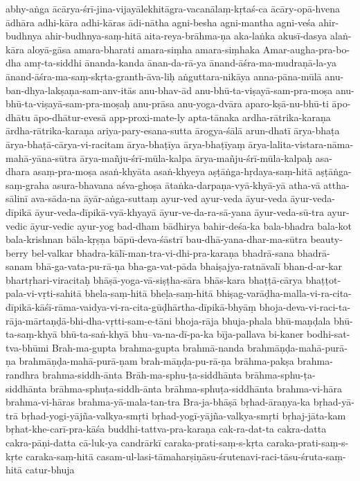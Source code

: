{abhy-aṅga
ācārya-śrī-jina-vijayālekhitāgra-vacanālaṃ-kṛtaś-ca
ācāry-opā-hvena
ādhāra
adhi-kāra
adhi-kāras
ādi-nātha
agni-besha
agni-mantha
agni-veśa
ahir-budhnya
ahir-budhnya-saṃ-hitā
aita-reya-brāhma-ṇa
aka-laṅka
akusī-dasya
alaṅ-kāra
aloyā-gāsa
amara-bharati
amara-siṃha
amara-siṃhaka
Amar-augha-pra-bo-dha
amṛ-ta-siddhi
ānanda-kanda
ānan-da-rā-ya
ānand-āśra-ma-mudraṇā-la-ya
ānand-āśra-ma-saṃ-skṛta-granth-āva-liḥ
aṅguttara-nikāya
anna-pāna-mūlā
anu-ban-dhya-lakṣaṇa-sam-anv-itās
anu-bhav-ād
anu-bhū-ta-viṣayā-sam-pra-moṣa
anu-bhū-ta-viṣayā-sam-pra-moṣaḥ
anu-prāsa
anu-yoga-dvāra
aparo-kṣā-nu-bhū-ti
āpo-dhātu
āpo-dhātur-evesā
app-proxi-mate-ly
apta-tānaka
ardha-rātrika-karaṇa
ārdha-rātrika-karaṇa
ariya-pary-esana-sutta
ārogya-śālā
arun-dhatī
ārya-bhaṭa
ārya-bhaṭā-cārya-vi-racitam
ārya-bhaṭīya
ārya-bhaṭīyaṃ
ārya-lalita-vistara-nāma-mahā-yāna-sūtra
ārya-mañju-śrī-mūla-kalpa
ārya-mañju-śrī-mūla-kalpaḥ
asa-dhara
asaṃ-pra-moṣa
asaṅ-khyāta
asaṅ-khyeya
aṣṭāṅga-hṛdaya-saṃ-hitā
aṣṭāṅga-saṃ-graha
asura-bhavana
aśva-ghoṣa
ātaṅka-darpaṇa-vyā-khyā-yā
atha-vā
attha-sālinī
ava-sāda-na
āyār-aṅga-suttaṃ
ayur-ved
ayur-veda
āyur-veda
āyur-veda-dīpikā
āyur-veda-dīpikā-vyā-khyayā
āyur-ve-da-ra-sā-yana
āyur-veda-sū-tra
ayur-vedic
āyur-vedic
ayur-yog
bad-dham
bādhirya
bahir-deśa-ka
bala-bhadra
bala-kot
bala-krishnan
bāla-kṛṣṇa
bāpū-deva-śāstrī
bau-dhā-yana-dhar-ma-sūtra
beauty-berry
bel-valkar
bhadra-kālī-man-tra-vi-dhi-pra-karaṇa
bhadrā-sana
bhadrā-sanam
bhā-ga-vata-pu-rā-ṇa
bha-ga-vat-pāda
bhaiṣajya-ratnāvalī
bhan-d-ar-kar
bhartṛhari-viracitaḥ
bhāṣā-yoga-vā-siṣṭha-sāra
bhās-kara
bhaṭṭā-cārya
bhaṭṭot-pala-vi-vṛti-sahitā
bhela-saṃ-hitā
bheḷa-saṃ-hitā
bhiṣag-varāḍha-malla-vi-ra-cita-dīpikā-kāśī-rāma-vaidya-vi-ra-cita-gūḍhārtha-dīpikā-bhyāṃ
bhoja-deva-vi-raci-ta-rāja-mārtaṇḍā-bhi-dha-vṛtti-sam-e-tāni
bhoja-rāja
bhuja-phala
bhū-maṇḍala
bhū-ta-saṃ-khyā
bhū-ta-saṅ-khyā
bhu--va-na-dī-pa-ka
bīja-pallava
bi-kaner
bodhi-sat-tva-bhūmi
Brah-ma-gupta
brahma-gupta
brahmā-nanda
brahmāṇḍa-mahā-purā-ṇa
brahmāṇḍa-mahā-purā-ṇam
brah-māṇḍa-pu-rā-ṇa
brāhma-pakṣa
brahma-randhra
brahma-siddh-ānta
Brāh-ma-sphu-ṭa-siddhānta
brāhma-sphu-ṭa-siddhānta
brāhma-sphuṭa-siddh-ānta
brāhma-sphuṭa-siddhānta
brahma-vi-hāra
brahma-vi-hāras
brahma-yā-mala-tan-tra
Bra-ja-bhāṣā
bṛhad-āraṇya-ka
bṛhad-yā-trā
bṛhad-yogi-yājña-valkya-smṛti
bṛhad-yogī-yājña-valkya-smṛti
bṛhaj-jāta-kam
bṛhat-khe-carī-pra-kāśa
buddhi-tattva-pra-karaṇa
cak-ra-dat-ta
cakra-datta
cakra-pāṇi-datta
cā-luk-ya
candrārkī
caraka-prati-saṃ-s-kṛta
caraka-prati-saṃ-s-kṛte
caraka-saṃ-hitā
casam-ul-lasi-tāmaharṣiṇāsu-śrutenavi-raci-tāsu-śruta-saṃ-hitā
catur-bhuja
}
